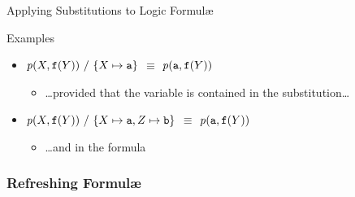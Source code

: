\documentclass[presentation]{beamer}\mode<presentation>{\usetheme{AMSBolognaFC}}
\begin{document}
\begin{frame}[allowframebreaks]{Applying Substitutions to Logic Formul\ae{}}
\begin{exampleblock}{Examples}
\begin{itemize}
            \item[] \alert{$\text{\textit{p}}(X, \mathtt{f}(Y)) \ /\  \{ X \mapsto \mathtt{a} \}$} $\equiv$ $\text{\textit{p}}(\mathtt{a}, \mathtt{f}(Y))$
            \begin{itemize}
                \item \ldots provided that the variable is contained in the substitution\ldots
            \end{itemize} 

            \item[] \alert{$\text{\textit{p}}(X, \mathtt{f}(Y)) \ /\  \{ X \mapsto \mathtt{a}, Z \mapsto \mathtt{b} \}$} $\equiv$ $\text{\textit{p}}(\mathtt{a}, \mathtt{f}(Y))$
            \begin{itemize}
                \item \ldots and in the formula
            \end{itemize} 
        \end{itemize}
    \end{exampleblock}
\end{frame}

\subsubsection{Refreshing Formul\ae{}}
\end{document}
